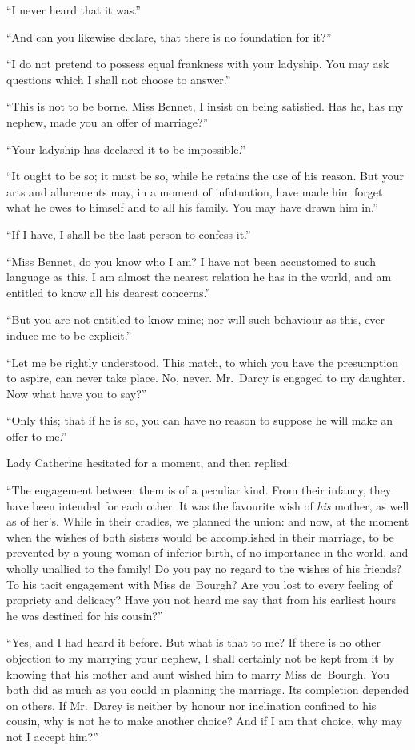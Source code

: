 ``I never heard that it was.''

``And can you likewise declare, that there is no foundation
for it?''

``I do not pretend to possess equal frankness with your ladyship.
You may ask questions which I shall not choose to answer.''

``This is not to be borne.  Miss Bennet, I insist on being
satisfied.  Has he, has my nephew, made you an offer of
marriage?''

``Your ladyship has declared it to be impossible.''

``It ought to be so; it must be so, while he retains the use of
his reason.  But your arts and allurements may, in a moment
of infatuation, have made him forget what he owes to himself
and to all his family.  You may have drawn him in.''

``If I have, I shall be the last person to confess it.''

``Miss Bennet, do you know who I am?  I have not been accustomed
to such language as this.  I am almost the nearest relation he has
in the world, and am entitled to know all his dearest concerns.''

``But you are not entitled to know mine; nor will such behaviour
as this, ever induce me to be explicit.''

``Let me be rightly understood.  This match, to which you have
the presumption to aspire, can never take place.  No, never.
Mr.\ Darcy is engaged to my daughter.  Now what have you to say?''

``Only this; that if he is so, you can have no reason to suppose
he will make an offer to me.''

Lady Catherine hesitated for a moment, and then replied:

``The engagement between them is of a peculiar kind.  From their
infancy, they have been intended for each other.  It was the
favourite wish of \emph{his} mother, as well as of her's.  While in
their cradles, we planned the union: and now, at the moment
when the wishes of both sisters would be accomplished in their
marriage, to be prevented by a young woman of inferior birth,
of no importance in the world, and wholly unallied to the
family!  Do you pay no regard to the wishes of his friends?
To his tacit engagement with Miss de~Bourgh?  Are you lost to
every feeling of propriety and delicacy?  Have you not heard
me say that from his earliest hours he was destined for his
cousin?''

``Yes, and I had heard it before.  But what is that to me?  If
there is no other objection to my marrying your nephew, I shall
certainly not be kept from it by knowing that his mother and
aunt wished him to marry Miss de~Bourgh.  You both did as much
as you could in planning the marriage.  Its completion depended
on others.  If Mr.\ Darcy is neither by honour nor inclination
confined to his cousin, why is not he to make another choice?
And if I am that choice, why may not I accept him?''

